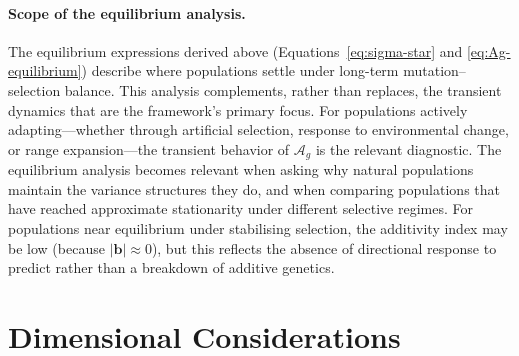 \documentclass[9pt,twocolumn,twoside,lineno]{gsajnl}
\newcommand{\Ag}{\ensuremath{\mathcal{A}_{g}}\xspace}
\newcommand{\Vlin}{\ensuremath{V_{\text{lin}}}\xspace}
\newcommand{\Vquad}{\ensuremath{V_{\text{quad}}}\xspace}
\begin{document}
\begin{figure}[!htb]
%
\label{fig:trajectories}
\end{figure}


\paragraph{Scope of the equilibrium analysis.}
The equilibrium expressions derived above (Equations~\eqref{eq:sigma-star} and \eqref{eq:Ag-equilibrium}) describe where populations settle under long-term mutation--selection balance. This analysis complements, rather than replaces, the transient dynamics that are the framework's primary focus. For populations actively adapting---whether through artificial selection, response to environmental change, or range expansion---the transient behavior of $\mathcal{A}_g$ is the relevant diagnostic. The equilibrium analysis becomes relevant when asking why natural populations maintain the variance structures they do, and when comparing populations that have reached approximate stationarity under different selective regimes. For populations near equilibrium under stabilising selection, the additivity index may be low (because $|\bm{b}| \approx 0$), but this reflects the absence of directional response to predict rather than a breakdown of additive genetics.
\section{Dimensional Considerations}
\label{sec:dimension}
\end{document}
